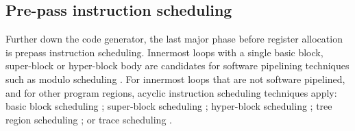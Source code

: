 \subsection{Pre-pass instruction scheduling}

Further down the code generator, the last major phase before register allocation
is prepass instruction scheduling. Innermost loops with a single basic block,
super-block or hyper-block body are candidates for software pipelining
techniques such as modulo scheduling \cite{Rau:1996:IJPP}. For innermost loops
that are not software pipelined, and for other program regions, acyclic
instruction scheduling techniques apply: basic block scheduling
\cite{Goodman:1988:ICS}; super-block scheduling \cite{Hwu:1993:JS}; hyper-block
scheduling \cite{Mahlke:1992:MICRO}; tree region scheduling
\cite{Havanki:1998:HPCA}; or trace scheduling \cite{Lowney:1993:JS}.

